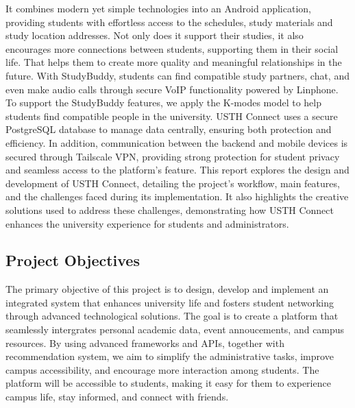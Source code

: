 \documentclass[12pt]{article}
\begin{document}
It combines modern yet simple technologies into an Android application, providing students with effortless access to the schedules, study materials and study location addresses.
Not only does it support their studies, it also encourages more connections between students, supporting them in their social life. That helps them to create more quality and meaningful relationships in the future.
With StudyBuddy, students can find compatible study partners, chat, and even make audio calls through secure VoIP functionality powered by Linphone.
To support the StudyBuddy features, we apply the K-modes model to help students find compatible people in the university.
USTH Connect uses a secure PostgreSQL database to manage data centrally, ensuring both protection and efficiency.
In addition, communication between the backend and mobile devices is secured through Tailscale VPN, providing strong protection for student privacy and seamless access to the platform's feature.
This report explores the design and development of USTH Connect, detailing the project's workflow, main features, and the challenges faced during its implementation. 
It also highlights the creative solutions used to address these challenges, demonstrating how USTH Connect enhances the university experience for students and administrators.

\subsection{Project Objectives}
The primary objective of this project is to design, develop and implement an integrated system that enhances
university life and fosters student networking through advanced technological solutions.
The goal is to create a platform that seamlessly intergrates personal academic data, event annoucements, and campus resources.
By using advanced frameworks and APIs, together with recommendation system, we aim to simplify the administrative tasks, improve campus accessibility, 
and encourage more interaction among students.
The platform will be accessible to students, making it easy for them to experience campus life, stay informed, and connect with friends.
\end{document}
